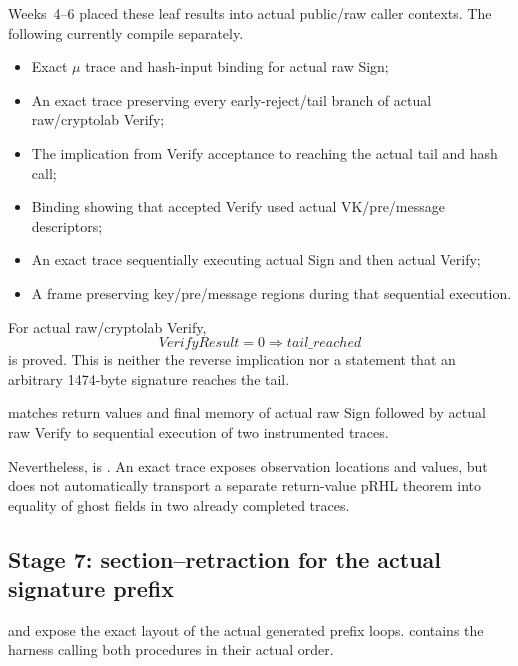 Weeks~4--6 placed these leaf results into actual public/raw caller contexts.
The following currently compile separately.

\begin{itemize}
  \item Exact \(\mu\) trace and hash-input binding for actual raw Sign;
  \item An exact trace preserving every early-reject/tail branch of actual raw/cryptolab Verify;
  \item The implication from Verify acceptance to reaching the actual tail and hash call;
  \item Binding showing that accepted Verify used actual VK/pre/message descriptors;
  \item An exact trace sequentially executing actual Sign and then actual Verify;
  \item A frame preserving key/pre/message regions during that sequential execution.
\end{itemize}

\begin{verified}
For actual raw/cryptolab Verify,
\[
  \mathit{VerifyResult}=0
  \Longrightarrow \mathit{tail\_reached}
\]
is proved. This is neither the reverse implication nor a statement that an
arbitrary 1474-byte signature reaches the tail.
\end{verified}

\begin{verified}
 matches return values and
final memory of actual raw Sign followed by actual raw Verify to sequential
execution of two instrumented traces.
\end{verified}

Nevertheless,  is \statuspartial.
An exact trace exposes observation locations and values, but does not
automatically transport a separate return-value pRHL theorem into equality
of ghost fields in two already completed traces.

\subsection{Stage 7: section--retraction for the actual signature prefix}

 and
 expose the exact layout of the
actual generated prefix loops.
 contains the harness calling
both procedures in their actual order.

